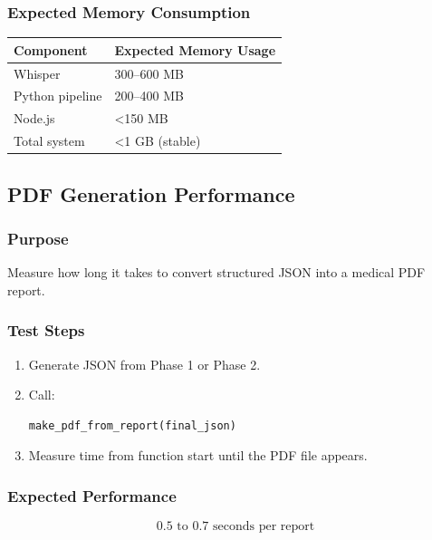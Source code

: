 \subsubsection*{Expected Memory Consumption}
\begin{table}[H]
\centering
\renewcommand{\arraystretch}{1.3}
\begin{tabular}{|p{5cm}|p{5cm}|}
\hline
\textbf{Component} & \textbf{Expected Memory Usage} \\ \hline
Whisper & 300–600 MB \\ \hline
Python pipeline & 200–400 MB \\ \hline
Node.js & <150 MB \\ \hline
Total system & <1 GB (stable) \\ \hline
\end{tabular}
\end{table}



\subsection{PDF Generation Performance}
\label{sec:testing:pdf}

\subsubsection*{Purpose}
Measure how long it takes to convert structured JSON into a medical PDF report.

\subsubsection*{Test Steps}
\begin{enumerate}
    \item Generate JSON from Phase 1 or Phase 2.
    \item Call:
\begin{verbatim}
make_pdf_from_report(final_json)
\end{verbatim}
    \item Measure time from function start until the PDF file appears.
\end{enumerate}

\subsubsection*{Expected Performance}
\[
0.5 \text{ to }0.7 \text{ seconds per report}
\]




